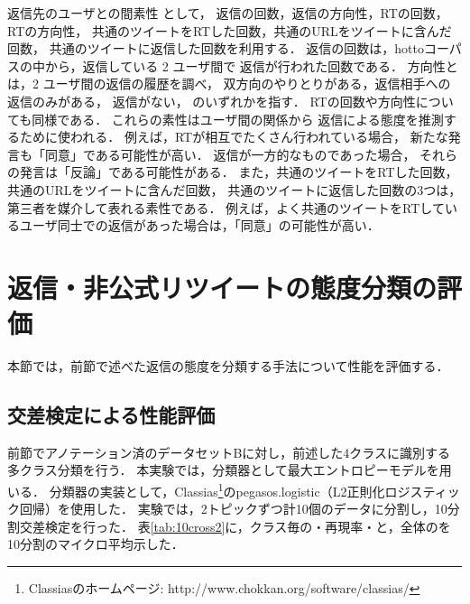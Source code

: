 \documentclass[japanese]{jnlp_1.4}
\newcommand{\addspan}[1]{}
\begin{document}
返信先のユーザとの間\addspan{の関係についての}素性
として，
返信の回数，返信の方向性，RTの回数，RTの方向性，
共通のツイートをRTした回数，共通のURLをツイートに含んだ回数，
共通のツイートに返信した回数を利用する．
返信の回数は，hottoコーパスの中から，返信している 2 ユーザ間で
返信が行われた回数である．
方向性とは，2 ユーザ間の返信の履歴を調べ，
双方向のやりとりがある，返信相手への返信のみがある，
返信がない，
のいずれかを指す．
RTの回数や方向性についても同様である．
これらの素性はユーザ間の関係から
返信による態度を推測するために使われる．
例えば，RTが相互でたくさん行われている場合，
新たな発言も「同意」である可能性が高い\addspan{と考えられる}．
返信が一方的なものであった場合，
それらの発言は「反論」である可能性がある\addspan{と考えられる}．
また，共通のツイートをRTした回数，共通のURLをツイートに含んだ回数，
共通のツイートに返信した回数の3つは，第三者を媒介して表れる素性である．
例えば，よく共通のツイートをRTしているユーザ同士での返信があった場合は，「同意」の可能性が高い\addspan{と考えられる}．
\addspan{これらの素性の設定における仮定の妥当性は，\ref{subsec:cross}節で検証する．}

\addspan{
以上，各素性の設計について述べたが，
本研究において特に重要と考えているのは，反論表現辞書との一致度および構造的特徴の利用である．
ここでいう構造的特徴とは，返信か引用かや，返信先のユーザとの間の関係についての各素性であり，これらはTwitter上の返信構造により生じる素性である．
また，反論表現辞書は，前述したように返信で用いられることの多い表現を元に作成しており，これらもまたTwitter上の返信構造により生じる素性と言える．
次節の評価では，返信構造により生じるこれらの素性がどの程度性能に寄与するのかについても示す．
}



\section{返信・非公式リツイートの態度分類の評価}

本節では，前節で述べた返信の態度を分類する手法について性能を評価する．


\subsection{交差検定による性能評価}
\label{subsec:cross}

前節でアノテーション済のデータセットBに対し，前述した4クラスに識別する多クラス分類を行う．
本実験では，分類器として最大エントロピーモデルを用いる．
分類器の実装として，Classias\footnote{Classiasのホームページ: http://www.chokkan.org/software/classias/}のpegasos.logistic（L2正則化ロジスティック回帰）を使用した．
実験では，2トピックずつ計10個のデータに分割し，10分割交差検定を行った．
表\ref{tab:10cross2}に，クラス毎の\addspan{精度}・再現率・\addspan{$F_1$値}と，全体の\addspan{正答率}を10分割のマイクロ平均\addspan{で}示した．
\addspan{
なお，$F_1$値については全クラスのMacro平均も示した．
}
\addspan{
$F_1$値の定義は以下の通りである．
{
\[
F_1 = \frac{2*精度*再現率}{精度*再現率}
\]
}}
\end{document}
